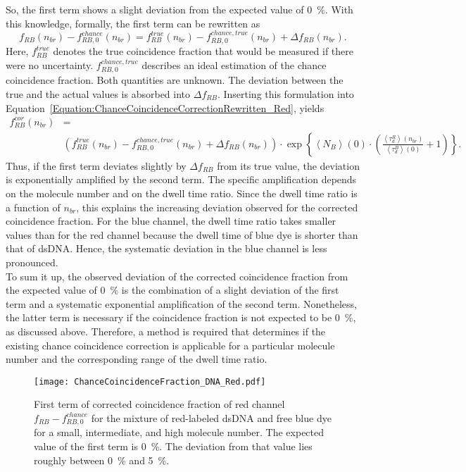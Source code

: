 So, the first term shows a slight deviation from the expected value of \SI{0}{\percent}. With this knowledge, formally, the first term can be rewritten as 
\begin{equation}
f_{RB}(n_{br}) - f_{RB,0}^{chance}(n_{br}) = f_{RB}^{true}(n_{br}) - f_{RB,0}^{chance,true}(n_{br}) + \Delta f_{RB}(n_{br}).
\end{equation}
Here, $f_{RB}^{true}$ denotes the true coincidence fraction that would be measured if there were no uncertainty. $f_{RB,0}^{chance,true}$ describes an ideal estimation of the chance coincidence fraction. Both quantities are unknown. The deviation between the true and the actual values is absorbed into $\Delta f_{RB}$. Inserting this formulation into Equation~\eqref{Equation:ChanceCoincidenceCorrectionRewritten_Red}, yields 
\begin{align}
f_{RB}^{cor} (n_{br}) &=\nonumber\\ &\left(f_{RB}^{true}(n_{br}) - f_{RB,0}^{chance,true}(n_{br}) + \Delta f_{RB}(n_{br})\right) \cdot  \exp\left\{\left\langle N_B \right\rangle (0) \cdot \left(\frac{\left\langle \tau_d^R\right\rangle (n_{br})}{\left\langle \tau_d^B \right\rangle (0)} + 1\right)\right\}.
\end{align}
Thus, if the first term deviates slightly by $\Delta f_{RB}$ from its true value, the deviation is exponentially amplified by the second term. The specific amplification depends on the molecule number and on the dwell time ratio. Since the dwell time ratio is a function of $n_{br}$, this explains the increasing deviation observed for the corrected coincidence fraction. For the blue channel, the dwell time ratio takes smaller values than for the red channel because the dwell time of blue dye is shorter than that of \gls{dsDNA}. Hence, the systematic deviation in the blue channel is less pronounced. \\

To sum it up, the observed deviation of the corrected coincidence fraction from the expected value of \SI{0}{\percent} is the combination of a slight deviation of the first term and a systematic exponential amplification of the second term. Nonetheless, the latter term is necessary if the coincidence fraction is not expected to be \SI{0}{\percent}, as discussed above. Therefore, a method is required that determines if the existing chance coincidence correction is applicable for a particular molecule number and the corresponding range of the dwell time ratio.

\vfill
\begin{figure}[h!]
	\centering
	\texttt{[image: ChanceCoincidenceFraction\_DNA\_Red.pdf]}
	\caption[First term of corrected coincidence fraction of red channel for mixture of red-labeled \gls{dsDNA} and free blue dye]{First term of corrected coincidence fraction of red channel $f_{RB} - f_{RB,0}^{chance}$ for the mixture of red-labeled \gls{dsDNA} and free blue dye for a small, intermediate, and high molecule number. The expected value of the first term is \SI{0}{\percent}. The deviation from that value lies roughly between \SI{0}{\percent} and \SI{5}{\percent}.}
	\label{fig:ChanceCoincidenceFraction_DNA_Red}
\end{figure}
\vfill


